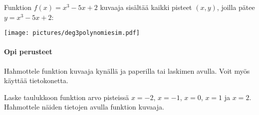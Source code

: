 \begin{esimerkki}
Funktion $f(x) = x^3-5x+2$ kuvaaja sisältää kaikki pisteet $(x, y)$, joilla pätee $y = x^3-5x+2$:
\begin{center}
\texttt{[image: pictures/deg3polynomiesim.pdf]}
\end{center}
\end{esimerkki}

\begin{tehtavasivu}

\paragraph*{Opi perusteet}

\begin{tehtava}
Hahmottele funktion kuvaaja kynällä ja paperilla tai laskimen avulla. Voit myös käyttää tietokonetta.
\begin{alakohdat}
\end{alakohdat}

\end{tehtava}

\begin{tehtava}
Laske taulukkoon funktion arvo pisteissä $x=-2$, $x=-1$, $x=0$, $x=1$ ja $x=2$. Hahmottele näiden tietojen avulla funktion kuvaaja.
\begin{alakohdat}
\end{alakohdat}
\begin{vastaus}
\begin{alakohdat}
\end{alakohdat}
\end{vastaus}
\end{tehtava}

\end{tehtavasivu}
